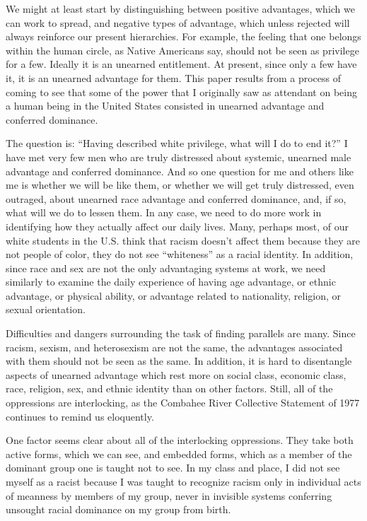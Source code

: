 \documentclass{article}
\begin{document}
We might at least start by distinguishing between positive advantages, which we
can work to spread, and negative types of advantage, which unless rejected will
always reinforce our present hierarchies. For example, the feeling that one
belongs within the human circle, as Native Americans say, should not be seen as
privilege for a few. Ideally it is an unearned entitlement. At present, since
only a few have it, it is an unearned advantage for them. This paper results
from a process of coming to see that some of the power that I originally saw as
attendant on being a human being in the United States consisted in unearned
advantage and conferred dominance.

The question is: ``Having described white privilege, what will I do to end
it?'' I have met very few men who are truly distressed about systemic, unearned
male advantage and conferred dominance. And so one question for me and others
like me is whether we will be like them, or whether we will get truly
distressed, even outraged, about unearned race advantage and conferred
dominance, and, if so, what will we do to lessen them. In any case, we need to
do more work in identifying how they actually affect our daily lives. Many,
perhaps most, of our white students in the U.S. think that racism doesn't
affect them because they are not people of color, they do not see ``whiteness''
as a racial identity.  In addition, since race and sex are not the only
advantaging systems at work, we need similarly to examine the daily experience
of having age advantage, or ethnic advantage, or physical ability, or advantage
related to nationality, religion, or sexual orientation.

Difficulties and dangers surrounding the task of finding parallels are many.
Since racism, sexism, and heterosexism are not the same, the advantages
associated with them should not be seen as the same. In addition, it is hard to
disentangle aspects of unearned advantage which rest more on social class,
economic class, race, religion, sex, and ethnic identity than on other factors.
Still, all of the oppressions are interlocking, as the Combahee River
Collective Statement of 1977 continues to remind us eloquently.

One factor seems clear about all of the interlocking oppressions. They take
both active forms, which we can see, and embedded forms, which as a member of
the dominant group one is taught not to see. In my class and place, I did not
see myself as a racist because I was taught to recognize racism only in
individual acts of meanness by members of my group, never in invisible systems
conferring unsought racial dominance on my group from birth.
\end{document}
